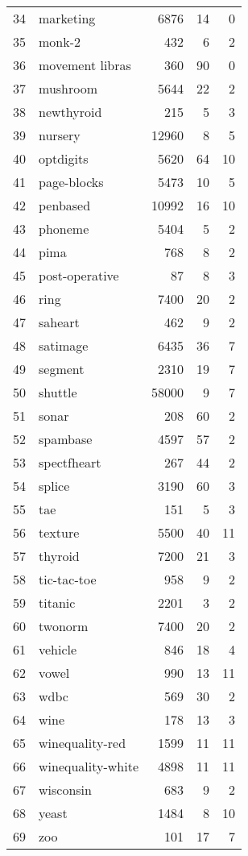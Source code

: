 \begin{table}
\begin{tabular}{llrrr}
34 & marketing & 6876 & 14 & 0 \\
35 & monk-2 & 432 & 6 & 2 \\
36 & movement libras & 360 & 90 & 0 \\
37 & mushroom & 5644 & 22 & 2 \\
38 & newthyroid & 215 & 5 & 3 \\
39 & nursery & 12960 & 8 & 5 \\
40 & optdigits & 5620 & 64 & 10 \\
41 & page-blocks & 5473 & 10 & 5 \\
42 & penbased & 10992 & 16 & 10 \\
43 & phoneme & 5404 & 5 & 2 \\
44 & pima & 768 & 8 & 2 \\
45 & post-operative & 87 & 8 & 3 \\
46 & ring & 7400 & 20 & 2 \\
47 & saheart & 462 & 9 & 2 \\
48 & satimage & 6435 & 36 & 7 \\
49 & segment & 2310 & 19 & 7 \\
50 & shuttle & 58000 & 9 & 7 \\
51 & sonar & 208 & 60 & 2 \\
52 & spambase & 4597 & 57 & 2 \\
53 & spectfheart & 267 & 44 & 2 \\
54 & splice & 3190 & 60 & 3 \\
55 & tae & 151 & 5 & 3 \\
56 & texture & 5500 & 40 & 11 \\
57 & thyroid & 7200 & 21 & 3 \\
58 & tic-tac-toe & 958 & 9 & 2 \\
59 & titanic & 2201 & 3 & 2 \\
60 & twonorm & 7400 & 20 & 2 \\
61 & vehicle & 846 & 18 & 4 \\
62 & vowel & 990 & 13 & 11 \\
63 & wdbc & 569 & 30 & 2 \\
64 & wine & 178 & 13 & 3 \\
65 & winequality-red & 1599 & 11 & 11 \\
66 & winequality-white & 4898 & 11 & 11 \\
67 & wisconsin & 683 & 9 & 2 \\
68 & yeast & 1484 & 8 & 10 \\
69 & zoo & 101 & 17 & 7 \\
\hline
\end{tabular}
\end{table}
